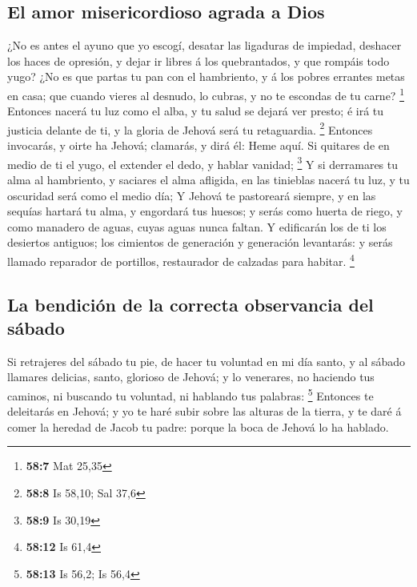 \hypertarget{el-amor-misericordioso-agrada-a-dios}{%
\subsection{El amor misericordioso agrada a
Dios}\label{el-amor-misericordioso-agrada-a-dios}}

 ¿No es antes el ayuno que yo escogí, desatar las ligaduras
de impiedad, deshacer los haces de opresión, y dejar ir libres á los
quebrantados, y que rompáis todo yugo?  ¿No es que partas tu
pan con el hambriento, y á los pobres errantes metas en casa; que cuando
vieres al desnudo, lo cubras, y no te escondas de tu carne? \footnote{\textbf{58:7}
  Mat 25,35}  Entonces nacerá tu luz como el alba, y tu
salud se dejará ver presto; é irá tu justicia delante de ti, y la gloria
de Jehová será tu retaguardia. \footnote{\textbf{58:8} Is 58,10; Sal
  37,6}  Entonces invocarás, y oirte ha Jehová; clamarás, y
dirá él: Heme aquí. Si quitares de en medio de ti el yugo, el extender
el dedo, y hablar vanidad; \footnote{\textbf{58:9} Is 30,19}
 Y si derramares tu alma al hambriento, y saciares el alma
afligida, en las tinieblas nacerá tu luz, y tu oscuridad será como el
medio día;  Y Jehová te pastoreará siempre, y en las
sequías hartará tu alma, y engordará tus huesos; y serás como huerta de
riego, y como manadero de aguas, cuyas aguas nunca faltan. 
Y edificarán los de ti los desiertos antiguos; los cimientos de
generación y generación levantarás: y serás llamado reparador de
portillos, restaurador de calzadas para habitar. \footnote{\textbf{58:12}
  Is 61,4}

\hypertarget{la-bendiciuxf3n-de-la-correcta-observancia-del-suxe1bado}{%
\subsection{La bendición de la correcta observancia del
sábado}\label{la-bendiciuxf3n-de-la-correcta-observancia-del-suxe1bado}}

 Si retrajeres del sábado tu pie, de hacer tu voluntad en
mi día santo, y al sábado llamares delicias, santo, glorioso de Jehová;
y lo venerares, no haciendo tus caminos, ni buscando tu voluntad, ni
hablando tus palabras: \footnote{\textbf{58:13} Is 56,2; Is 56,4}
 Entonces te deleitarás en Jehová; y yo te haré subir sobre
las alturas de la tierra, y te daré á comer la heredad de Jacob tu
padre: porque la boca de Jehová lo ha hablado.

